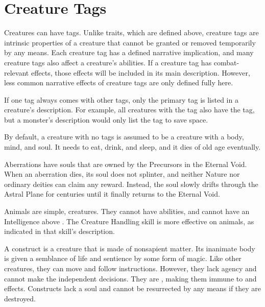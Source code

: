 \newpage
\section{Creature Tags}\label{Creature Tags}

  Creatures can have tags.
  Unlike traits, which are defined above, creature tags are intrinsic properties of a creature that cannot be granted or removed temporarily by any means.
  Each creature tag has a defined narrative implication, and many creature tags also affect a creature's abilities.
  If a creature tag has combat-relevant effects, those effects will be included in its main description.
  However, less common narrative effects of creature tags are only defined fully here.

  If one tag always comes with other tags, only the primary tag is listed in a creature's description.
  For example, all creatures with the  tag also have the  tag, but a monster's description would only list the  tag to save space.

  By default, a creature with no tags is assumed to be a  creature with a body, mind, and soul.
  It needs to eat, drink, and sleep, and it dies of old age eventually.

  Aberrations have souls that are owned by the Precursors in the Eternal Void.
  When an aberration dies, its soul does not splinter, and neither Nature nor ordinary deities can claim any reward.
  Instead, the soul slowly drifts through the Astral Plane for centuries until it finally returns to the Eternal Void.

  Animals are simple,  creatures.
  They cannot have \magical abilities, and cannot have an Intelligence above .
  The Creature Handling skill is more effective on animals, as indicated in that skill's description.

   A construct is a creature that is made of nonsapient matter.
  Its inanimate body is given a semblance of life and sentience by some form of magic.
  Like other creatures, they can move and follow instructions.
  However, they lack agency and cannot make the independent decisions.
  They are , making them immune to  and  effects.
  Constructs lack a soul and cannot be resurrected by any means if they are destroyed.

